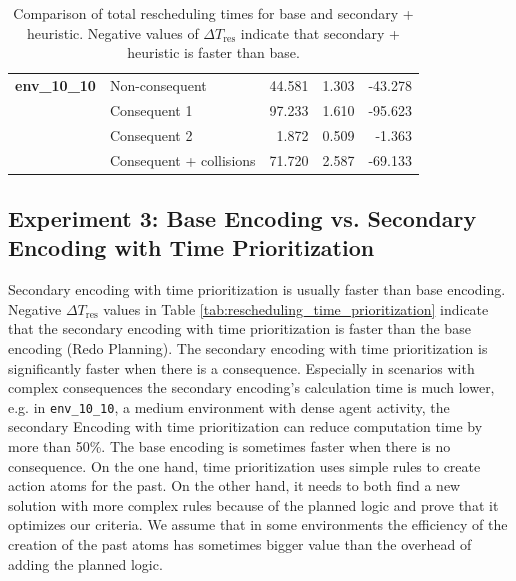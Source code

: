 \documentclass[runningheads]{llncs}
\begin{document}
\begin{table}[htbp]
\begin{tabular}{@{}llrrr@{}}
		\midrule
		
		\textbf{env\_10\_10}
		& Non-consequent & 44.581 & 1.303 & -43.278 \\
		& Consequent 1 & 97.233 & 1.610 & -95.623 \\
		& Consequent 2 & 1.872 & 0.509 & -1.363 \\
		& Consequent + collisions & 71.720 & 2.587 & -69.133 \\
		
		\bottomrule
	\end{tabular}
	\vspace{4mm}
	\caption{Comparison of total rescheduling times for base and secondary + heuristic. Negative values of $\Delta T_{\mathrm{res}}$ indicate that secondary + heuristic is faster than base.}
	\label{tab:rescheduling_times_base}
\end{table}

\subsection{Experiment 3: Base Encoding vs. Secondary Encoding with Time Prioritization}

Secondary encoding with time prioritization is usually faster than base encoding.
Negative $\Delta T_{\mathrm{res}}$ values in Table \ref{tab:rescheduling_time_prioritization} indicate that the secondary encoding with time prioritization is faster than the base encoding (Redo Planning). 
The secondary encoding with time prioritization is significantly faster when there is a consequence. Especially in scenarios with complex consequences the secondary encoding's calculation time is much lower, e.g. in \texttt{env\_10\_10}, a medium environment with dense agent activity, the secondary Encoding with time prioritization can reduce computation time by more than 50\%.
The base encoding is sometimes faster when there is no consequence. 
On the one hand, time prioritization uses simple rules to create action atoms for the past. On the other hand, it needs to both find a new solution with more complex rules because of the planned logic and prove that it optimizes our criteria.
We assume that in some environments the efficiency of the creation of the past atoms has sometimes bigger value than the overhead of adding the planned logic.
\end{document}
